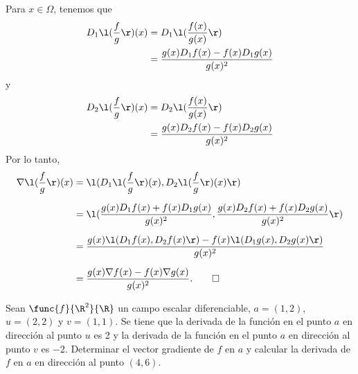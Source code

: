 \documentclass[a4,11pt]{aleph-examen}
\begin{document}
\begin{preguntas}
\begin{respuesta}
\begin{respuesta}
\begin{respuesta}
    Para $x\in\Omega$, tenemos que
    \begin{align*}
        D_1\l(\frac{f}{g}\r)(x)
            & = D_1 \l(\frac{f(x)}{g(x)}\r) \\
            & = \frac{g(x) D_1 f(x)  - f(x) D_1g(x)}{g(x)^2}
    \end{align*}
    y
    \begin{align*}
        D_2\l(\frac{f}{g}\r)(x)
            & = D_2\l(\frac{f(x)}{g(x)}\r) \\
            & = \frac{g(x) D_2f(x) - f(x) D_2g(x)}{g(x)^2}
    \end{align*}
    Por lo tanto,
    \begin{align*}
        \nabla\l(\frac{f}{g}\r)(x)
            & = \l(D_1\l(\frac{f}{g}\r)(x),D_2\l(\frac{f}{g}\r)(x) \r)\\[2mm]
            & = \l( \frac{g(x)D_1 f(x) + f(x)D_1g(x)}{g(x)^2} , \frac{g(x)D_2 f(x) + f(x)D_2g(x)}{g(x)^2} \r)\\[2mm]
            & = \frac{g(x)\l(D_1f(x),D_2f(x)\r) - f(x)\l(D_1g(x),D_2g(x)\r)}{g(x)^2}\\[2mm]
            & = \frac{g(x)\nabla f(x)-f(x)\nabla g(x)}{g(x)^2}.\qedhere
    \end{align*}
\end{respuesta}

\item
    Sean $\func{f}{\R^2}{\R}$ un campo escalar diferenciable, $a=(1,2)$, $u=(2,2)$ y $v=(1,1)$. Se tiene que la derivada de la función en el punto $a$ en dirección al punto $u$ es 2 y la derivada de la función en el punto $a$ en dirección al punto $v$ es $-2$. Determinar el vector gradiente de $f$ en $a$ y calcular la derivada de $f$ en $a$ en dirección al punto $(4,6)$. 


\end{respuesta}
\end{respuesta}
\end{preguntas}
\end{document}
